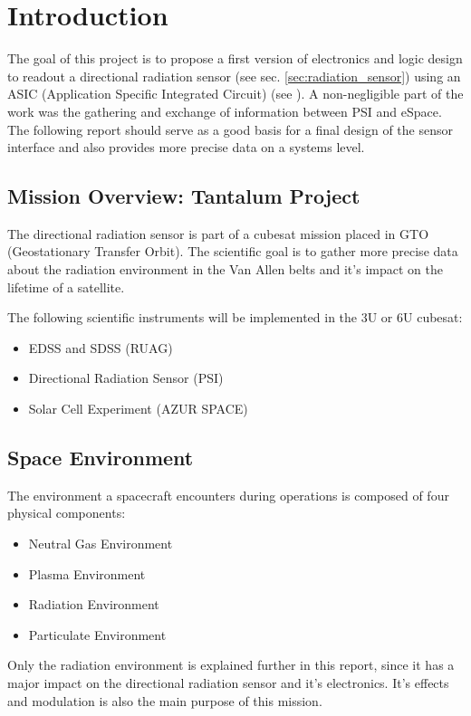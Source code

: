 \section{Introduction}
\label{sec:introduction}
The goal of this project is to propose a first version of electronics and logic design to readout a directional radiation sensor (see sec. \ref{sec:radiation_sensor}) using an ASIC (Application Specific Integrated Circuit) (see \cite{Meier2016VATA466}).
A non-negligible part of the work was the gathering and exchange of information between PSI and eSpace.
The following report should serve as a good basis for a final design of the sensor interface and also provides more precise data on a systems level.

\subsection{Mission Overview: Tantalum Project}
\label{sec:mission_overview}
The directional radiation sensor is part of a cubesat mission placed in GTO (Geostationary Transfer Orbit).
The scientific goal is to gather more precise data about the radiation environment in the Van Allen belts and it's impact on the lifetime of a satellite.

The following scientific instruments will be implemented in the 3U or 6U cubesat:\cite{tantalumproject2016}
\begin{itemize}
	\item EDSS and SDSS (RUAG)
	\item Directional Radiation Sensor (PSI)
	\item Solar Cell Experiment (AZUR SPACE)
\end{itemize}


\subsection{Space Environment}
\label{sec:space_environment}
The environment a spacecraft encounters during operations is composed of four physical components:\cite{hastings2004spacecraft}
\begin{itemize}
	\item Neutral Gas Environment
	\item Plasma Environment
	\item Radiation Environment
	\item Particulate Environment
\end{itemize}

Only the radiation environment is explained further in this report, since it has a major impact on the directional radiation sensor and it's electronics.
It's effects and modulation is also the main purpose of this mission.

